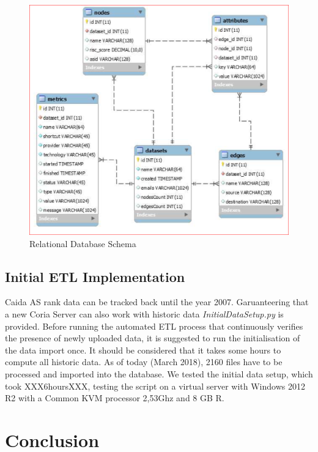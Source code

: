 \documentclass[conference, 11pt]{IEEEtran}
\begin{document}
\vspace{0.5cm}
\begin{figure}[htbp]
\centerline{\includegraphics[scale=0.33]{Graphics/SQL_schema.PNG}}
\caption{Relational Database Schema}
\label{fig:SQL_schema}
\end{figure}
\vspace{0.5cm}

\subsection{Initial ETL Implementation}
Caida AS rank data can be tracked back until the year 2007. Garuanteering that a new Coria Server can also work with historic data \textit{InitialDataSetup.py} is provided. Before running the automated ETL process that continuously verifies the presence of newly uploaded data, it is suggested to run the initialisation of the data import once. It should be considered that it takes some hours to compute all historic data. As of today (March 2018), 2160 files have to be processed and imported into the database. We tested the initial data setup, which took XXX6hoursXXX, testing the script on a virtual server with Windows 2012 R2 with a Common KVM processor 2,53Ghz and 8 GB R.  




\section{Conclusion}
\end{document}
